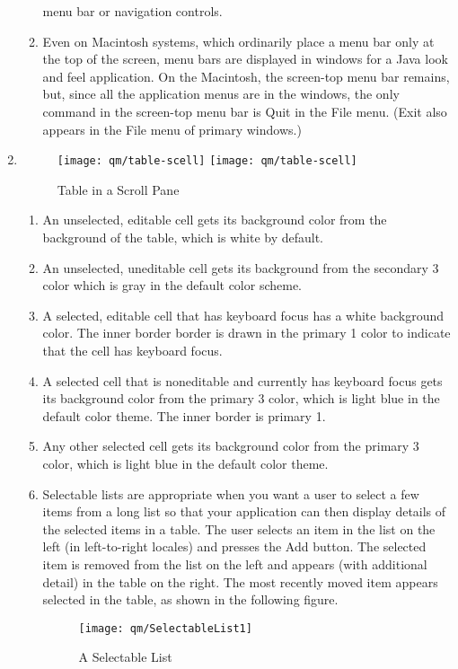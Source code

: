 \begin{enumerate}
\begin{enumerate}
  menu bar or navigation controls.
\item Even on Macintosh systems, which ordinarily place a menu bar only at the
  top of the screen, menu bars are displayed in windows for a Java look and
  feel application. On the Macintosh, the screen-top menu bar remains, but,
  since all the application menus are in the windows, the only command in the
  screen-top menu bar is Quit in the File menu. (Exit also appears in the File
  menu of primary windows.)
\end{enumerate}
\newpage
\item {}
\begin{figure}[H]
\ifslides
\centering
\texttt{[image: qm/table-scell]}
\else
\texttt{[image: qm/table-scell]}
\caption{Table in a Scroll Pane}
\fi
\end{figure}
\newslide
\begin{enumerate}
\item An unselected, editable cell gets its background color from the
  background of the table, which is white by default.
\item An unselected, uneditable cell gets its background from the secondary 3
  color which is gray in the default color scheme.
\item A selected, editable cell that has keyboard focus has a white background
  color. The inner border border is drawn in the primary 1 color to indicate
  that the cell has keyboard focus.
\item A selected cell that is noneditable and currently has keyboard focus
  gets its background color from the primary 3 color, which is light blue in
  the default color theme. The inner border is primary 1.
\item Any other selected cell gets its background color from the primary 3
  color, which is light blue in the default color theme.
\newslide
\item Selectable lists are appropriate when you want a user to select a few
  items
from a long list so that your application can then display details of the
selected items in a table. The user selects an item in the list on the left
(in left-to-right locales) and presses the Add button. The selected item is
removed from the list on the left and appears (with additional detail) in the
table on the right. The most recently moved item appears selected in the
table, as shown in the following figure.
\newslide
\begin{figure}[H]
\centering
\texttt{[image: qm/SelectableList1]}
\caption{A Selectable List}
\end{figure}
\end{enumerate}
\end{enumerate}
%
%

